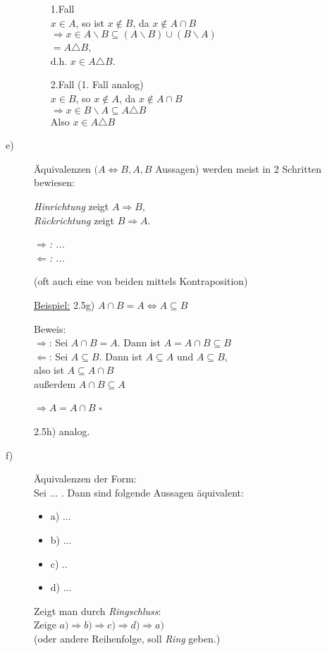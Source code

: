 \documentclass[a4paper, 12pt, twoside] {article}
\begin{document}
\begin{description}
\begin{itemize}
\item[1.Fall] \hfill \\
$x \in A$, so ist $x \notin B$, da $x \notin A \cap B$ \\
$\Rightarrow x \in A \backslash B \subseteq (A \backslash B) \cup (B \backslash A)$ \\
$ = A \triangle B$, \\
d.h. $x \in A \triangle B$.

\item[2.Fall] (1. Fall analog) \hfill \\
$x \in B$, so $x \notin A$, da $x \notin A \cap B$ \\
$\Rightarrow x \in B \backslash A \subseteq A \triangle B$ \\
Also $x \in A \triangle B$
\end{itemize}

\item[e)]
Äquivalenzen $(A \Leftrightarrow B, A, B$ Aussagen) werden meist in 2 Schritten bewiesen:

\textit{Hinrichtung} zeigt $A \Rightarrow B$, \\
\textit{Rückrichtung} zeigt $B \Rightarrow A$.

\textit{$\Rightarrow$: ...} \\
\textit{$\Leftarrow$: ...}

(oft auch eine von beiden mittels Kontraposition)

\underline{Beispiel:} 2.5g) $A \cap B = A \Leftrightarrow A \subseteq B$

Beweis: \\
\textit{$\Rightarrow$}: Sei $ A \cap B = A$. Dann ist $A = A \cap B \subseteq B$ \\
\textit{$\Leftarrow$}: Sei $A \subseteq B$. Dann ist $A \subseteq A$ und $A \subseteq B$, \\
also ist $A \subseteq A \cap B$ \\
außerdem $A \cap B \subseteq A$

$\Rightarrow A = A \cap B$ \hfill $\square$

2.5h) analog.

\item[f)]
Äquivalenzen der Form: \\
Sei ... . Dann sind folgende Aussagen äquivalent:

\begin{itemize}
\item a) ...
\item b) ...
\item c) ..
\item d) ...
\end{itemize}

Zeigt man durch \textit{Ringschluss}: \\
Zeige $a) \Rightarrow b) \Rightarrow c) \Rightarrow d) \Rightarrow a)$ \\
(oder andere Reihenfolge, soll \textit{Ring} geben.)

\end{description}
\end{document}

